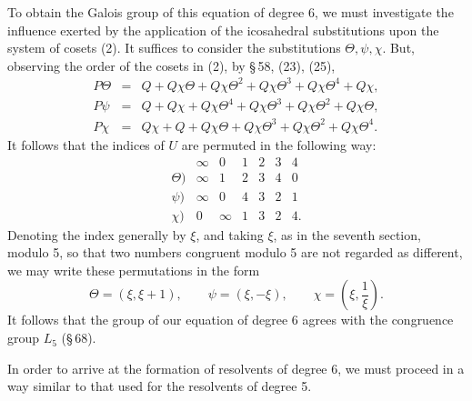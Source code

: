 \documentclass[11pt]{article}
\begin{document}
To obtain the Galois group of this equation of degree 6, we must investigate the influence exerted by the application of the icosahedral substitutions upon the system of cosets (2). It suffices to consider the substitutions \(\Theta,\psi,\chi\). But, observing the order of the cosets in (2), by \S\,58, (23), (25),
\[
\begin{array}{rcl}
P\Theta&=&Q+Q\chi\Theta+Q\chi\Theta^2+Q\chi\Theta^3+Q\chi\Theta^4+Q\chi,\\
P\psi&=&Q+Q\chi+Q\chi\Theta^4+Q\chi\Theta^3+Q\chi\Theta^2+Q\chi\Theta,\\
P\chi&=&Q\chi+Q+Q\chi\Theta+Q\chi\Theta^3+Q\chi\Theta^2+Q\chi\Theta^4.
\end{array}
\]
It follows that the indices of \(U\) are permuted in the following way:
\[
\begin{array}{c|rrrrrr}
&\infty&0&1&2&3&4\\\hline
\Theta)&\infty&1&2&3&4&0\\
\psi)&\infty&0&4&3&2&1\\
\chi)&0&\infty&1&3&2&4.
\end{array}
\]
Denoting the index generally by \(\xi\), and taking \(\xi\), as in the seventh section, modulo 5, so that two numbers congruent modulo 5 are not regarded as different, we may write these permutations in the form
\[
\Theta=(\xi,\xi+1),
\qquad
\psi=(\xi,-\xi),
\qquad
\chi=\left(\xi,\frac1\xi\right).
\]
It follows that the group of our equation of degree 6 agrees with the congruence group \(L_5\) (\S\,68).

In order to arrive at the formation of resolvents of degree 6, we must proceed in a way similar to that used for the resolvents of degree 5.
\end{document}
